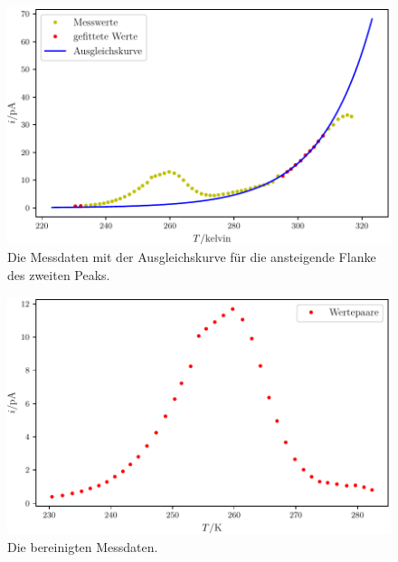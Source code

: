 \begin{figure}
	\centering
	\includegraphics[width=\linewidth-60pt,height=\textheight-60pt,keepaspectratio]{content/images/plot2exp.pdf}
	\caption{Die Messdaten mit der Ausgleichskurve für die ansteigende Flanke des zweiten Peaks.}
	\label{fig:plot2exp}
\end{figure}

\begin{figure}
	\centering
	\includegraphics[width=\linewidth-60pt,height=\textheight-60pt,keepaspectratio]{content/images/bereinigt2.pdf}
	\caption{Die bereinigten Messdaten.}
	\label{fig:bereinigt2}
\end{figure}

